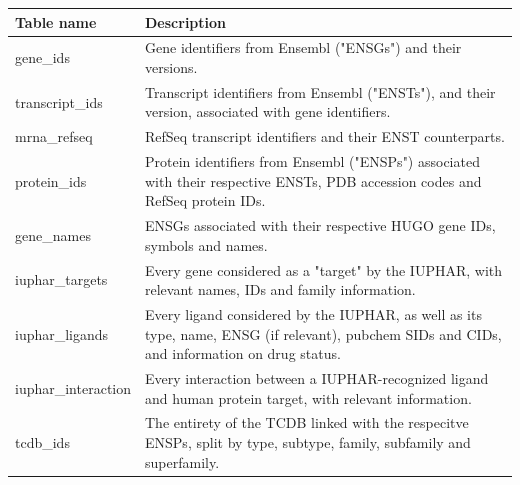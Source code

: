

\begin{table}
\begin{tabularx}{\textwidth}{|l|X|}
\hline
\textbf{Table name}       & \textbf{Description}                                                                                                                                                \\ \hline \hline
gene\_ids                 & Gene identifiers from Ensembl ("ENSGs") and their versions.                                                                                                         \\ \hline
transcript\_ids           & Transcript identifiers from Ensembl ("ENSTs"), and their version, associated with gene identifiers.                                                                 \\ \hline
mrna\_refseq              & RefSeq transcript identifiers and their ENST counterparts.                                                                                                           \\ \hline
protein\_ids              & Protein identifiers from Ensembl ("ENSPs") associated with their respective ENSTs, PDB accession codes and RefSeq protein IDs.                                       \\ \hline
gene\_names               & ENSGs associated with their respective HUGO gene IDs, symbols and names.                                                                                            \\ \hline
iuphar\_targets           & Every gene considered as a "target" by the IUPHAR, with relevant names, IDs and family information.                                                                 \\ \hline
iuphar\_ligands           & Every ligand considered by the IUPHAR, as well as its type, name, ENSG (if relevant), pubchem SIDs and CIDs, and information on drug status.                        \\ \hline
iuphar\_interaction       & Every interaction between a IUPHAR-recognized ligand and human protein target, with relevant information.                                                           \\ \hline
tcdb\_ids                 & The entirety of the TCDB linked with the respecitve ENSPs, split by type, subtype, family, subfamily and superfamily.                                               \\ \hline

\end{tabularx}
\end{table}
